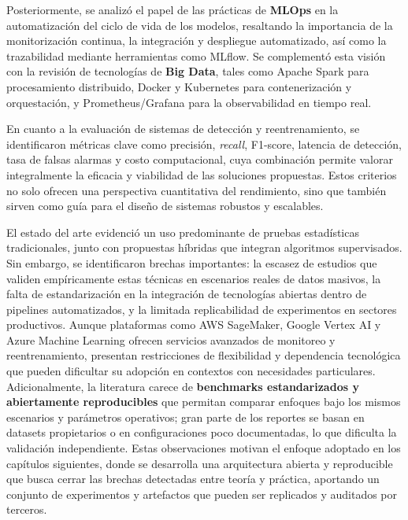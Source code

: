 Posteriormente, se analizó el papel de las prácticas de \textbf{MLOps} en la automatización del ciclo de vida de los modelos, resaltando la importancia de la monitorización continua, la integración y despliegue automatizado, así como la trazabilidad mediante herramientas como MLflow. Se complementó esta visión con la revisión de tecnologías de \textbf{Big Data}, tales como Apache Spark para procesamiento distribuido, Docker y Kubernetes para contenerización y orquestación, y Prometheus/Grafana para la observabilidad en tiempo real.

En cuanto a la evaluación de sistemas de detección y reentrenamiento, se identificaron métricas clave como precisión, \textit{recall}, F1-score, latencia de detección, tasa de falsas alarmas y costo computacional, cuya combinación permite valorar integralmente la eficacia y viabilidad de las soluciones propuestas. Estos criterios no solo ofrecen una perspectiva cuantitativa del rendimiento, sino que también sirven como guía para el diseño de sistemas robustos y escalables.

El estado del arte evidenció un uso predominante de pruebas estadísticas tradicionales, junto con propuestas híbridas que integran algoritmos supervisados. Sin embargo, se identificaron brechas importantes: la escasez de estudios que validen empíricamente estas técnicas en escenarios reales de datos masivos, la falta de estandarización en la integración de tecnologías abiertas dentro de pipelines automatizados, y la limitada replicabilidad de experimentos en sectores productivos. Aunque plataformas como AWS SageMaker, Google Vertex AI y Azure Machine Learning ofrecen servicios avanzados de monitoreo y reentrenamiento, presentan restricciones de flexibilidad y dependencia tecnológica que pueden dificultar su adopción en contextos con necesidades particulares. Adicionalmente, la literatura carece de \textbf{benchmarks estandarizados y abiertamente reproducibles} que permitan comparar enfoques bajo los mismos escenarios y parámetros operativos; gran parte de los reportes se basan en datasets propietarios o en configuraciones poco documentadas, lo que dificulta la validación independiente. Estas observaciones motivan el enfoque adoptado en los capítulos siguientes, donde se desarrolla una arquitectura abierta y reproducible que busca cerrar las brechas detectadas entre teoría y práctica, aportando un conjunto de experimentos y artefactos que pueden ser replicados y auditados por terceros.

